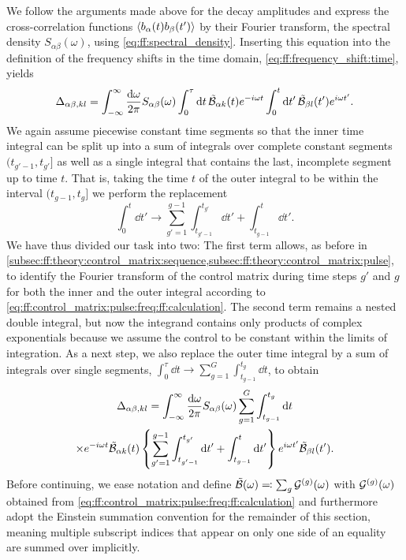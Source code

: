We follow the arguments made above for the decay amplitudes and express the cross-correlation functions $\ev{b_\alpha(t) b_\beta(t')}$ by their Fourier transform, the spectral density $S_{\alpha\beta}(\omega)$, using \cref{eq:ff:spectral_density}.
Inserting this equation into the definition of the frequency shifts in the time domain, \cref{eq:ff:frequency_shift:time}, yields
\begin{equation}\label{eq:ff:frequency_shifts:time}
\Delta_{\alpha\beta,kl} = \int_{-\infty}^\infty\frac{\dd{\omega}}{2\pi} S_{\alpha\beta}(\omega)
\int_0^\tau\dd{t}\tilde{\mathcal{B}}_{\alpha k}(t)e^{-i\omega t}
\int_0^t\dd{t'}\tilde{\mathcal{B}}_{\beta l}(t')e^{i\omega t'}.
\end{equation}
We again assume piecewise constant time segments so that the inner time integral can be split up into a sum of integrals over complete constant segments $(t_{g'-1},t_{g'}]$ as well as a single integral that contains the last, incomplete segment up to time $t$.
That is, taking the time $t$ of the outer integral to be within the interval $(t_{g-1}, t_g]$ we perform the replacement
\begin{equation}
    \int_0^t\dd{t'} \rightarrow \sum_{g'=1}^{g-1}\int_{t_{g'-1}}^{t_{g'}}\dd{t'} + \int_{t_{g-1}}^{t}\dd{t'}.
\end{equation}
We have thus divided our task into two: The first term allows, as before in \cref{subsec:ff:theory:control_matrix:sequence,subsec:ff:theory:control_matrix:pulse}, to identify the Fourier transform of the control matrix during time steps $g'$ and $g$ for both the inner and the outer integral according to \cref{eq:ff:control_matrix:pulse:freq:ff:calculation}.
The second term remains a nested double integral, but now the integrand contains only products of complex exponentials because we assume the control to be constant within the limits of integration.
As a next step, we also replace the outer time integral by a sum of integrals over single segments, $\int_0^\tau\dd{t}\rightarrow\sum_{g=1}^G\int_{t_{g-1}}^{t_g}\dd{t}$, to obtain
\begin{multline}\label{eq:ff:frequency_shifts:time:substituted}
\Delta_{\alpha\beta,kl} = \int_{-\infty}^\infty\frac{\dd{\omega}}{2\pi} S_{\alpha\beta}(\omega)
\sum_{g=1}^{G}\int_{t_{g-1}}^{t_{g}}\dd{t} \\
\times e^{-i\omega t}\tilde{\mathcal{B}}_{\alpha k}(t)
\left\lbrace\sum_{g'=1}^{g-1}\int_{t_{g'-1}}^{t_{g'}}\dd{t'} + \int_{t_{g-1}}^{t}\dd{t'}\right\rbrace
e^{i\omega t'}\tilde{\mathcal{B}}_{\beta l}(t').
\end{multline}
Before continuing, we ease notation and define $\tilde{\mathcal{B}}(\omega) \eqqcolon \sum_g\mathcal{G}^{(g)}(\omega)$ with $\mathcal{G}^{(g)}(\omega)$ obtained from \cref{eq:ff:control_matrix:pulse:freq:ff:calculation} and furthermore adopt the Einstein summation convention for the remainder of this section, meaning multiple subscript indices that appear on only one side of an equality are summed over implicitly.

